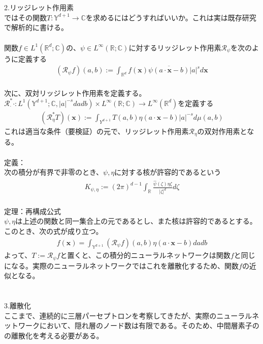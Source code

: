 \documentclass{jsarticle}
\begin{document}
　\\
　\\
2.リッジレット作用素\\
ではその関数$T:\mathbb{Y}^{d+1}\rightarrow\mathbb{C}$を求めるにはどうすればいいか。これは実は既存研究で解析的に書ける。\\
　\\
関数$f\in L^1(\mathbb{R}^{d};\mathbb{C})$の、$\psi\in L^\infty(\mathbb{R};\mathbb{C})$に対するリッジレット作用素$\mathcal{R}_\psi$を次のように定義する
\begin{eqnarray}
(\mathcal{R}_\psi f)(a,b):=\int_{\mathbb{R}^{d}}f(\bm{x})\overline{\psi(a\cdot\bm{x}-b)}|a|^sd\bm{x}
\end{eqnarray}
　\\
次に、双対リッジレット作用素を定義する。\\
$\mathcal{R}^*_\cdot \cdot:L^1(\mathbb{Y}^{d+1};\mathbb{C},|a|^{-s}dadb)\times L^\infty(\mathbb{R};\mathbb{C})\rightarrow L^\infty(\mathbb{R}^d)$を定義する
\begin{eqnarray}
(\mathcal{R}^*_\eta T)(\bm{x}):=\int_{Y^{d+1}}T(a,b)\eta(a\cdot\bm{x}-b)|a|^{-s}d\mu(a,b)
\end{eqnarray}
これは適当な条件（要検証）の元で、リッジレット作用素$\mathcal{R}_\eta$の双対作用素となる。\\
　\\
定義：\\
次の積分が有界で非零のとき、$\psi,\eta$に対する核が許容的であるという
\begin{eqnarray}
K_{\psi,\eta}:=(2\pi)^{d-1}\int_\mathbb{R}\frac{\overline{\hat{\psi}(\zeta)}\eta{\zeta}}{|\zeta|^d}d\zeta
\end{eqnarray}
　\\
定理：再構成公式\\
$\psi,\eta$は上述の関数と同一集合上の元であるとし、また核は許容的であるとする。このとき、次の式が成り立つ。
\begin{eqnarray}
f(\bm{x})=\int_{\mathbb{Y}^{d+1}}(\mathcal{R}_\psi f)(a,b)\eta(a\cdot\bm{x}-b)dadb
\end{eqnarray}
よって、$T:=\mathcal{R}_\psi f$と置くと、この積分的ニューラルネットワークは関数$f$と同じになる。実際のニューラルネットワークではこれを離散化するため、関数$f$の近似となる。\\
　\\
　\\
3.離散化\\
ここまで、連続的に三層パーセプトロンを考察してきたが、実際のニューラルネットワークにおいて、隠れ層のノード数は有限である。そのため、中間層素子のの離散化を考える必要がある。\\
\end{document}
